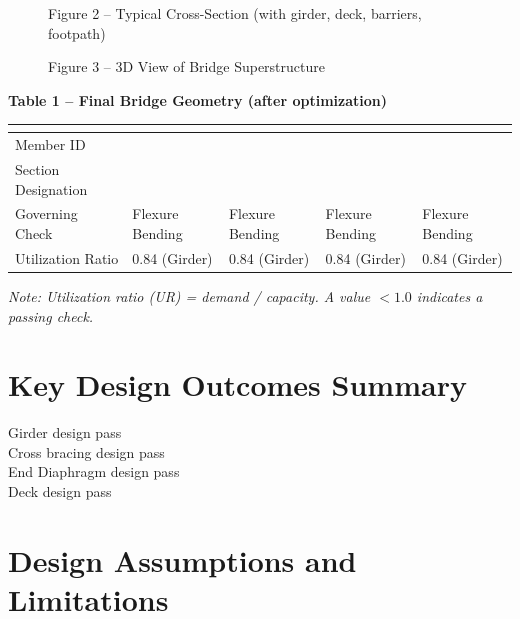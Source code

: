 \documentclass[12pt,a4paper]{report}
\numberwithin{table}{chapter}
\numberwithin{figure}{chapter}
\begin{document}
\newpage

\begin{figure}[H]
\centering
{}
\caption*{Figure 2 -- Typical Cross-Section (with girder, deck, barriers, footpath)}
\end{figure}

\begin{figure}[H]
\centering
{}
\caption*{Figure 3 -- 3D View of Bridge Superstructure}
\end{figure}

\noindent\textbf{Table 1 -- Final Bridge Geometry (after optimization)}

\vspace{0.4em}
\noindent
\begin{tabular}{|C{2.8cm}|C{3.0cm}|C{3.0cm}|C{3.0cm}|C{3.0cm}|}
\hline
  \textbf{} &
  \textbf{} &
  \textbf{} &
  \textbf{} &
  \textbf{} \\
\hline
Member ID &  &  &  &  \\
\hline
Section Designation &  &  &  &  \\
\hline
Governing Check & Flexure Bending & Flexure Bending & Flexure Bending & Flexure Bending \\
\hline
Utilization Ratio & 0.84 (Girder) & 0.84 (Girder) & 0.84 (Girder) & 0.84 (Girder) \\
\hline
\end{tabular}

\vspace{0.4em}
\noindent\textit{Note: Utilization ratio (UR) = demand / capacity. A value $< 1.0$ indicates a passing check.}

\vspace{1em}

\section*{Key Design Outcomes Summary}
\label{sec:key-outcomes}

\noindent Girder design pass \\
Cross bracing design pass \\
End Diaphragm design pass \\
Deck design pass

\section*{Design Assumptions and Limitations}
\label{sec:assumptions}
\end{document}
